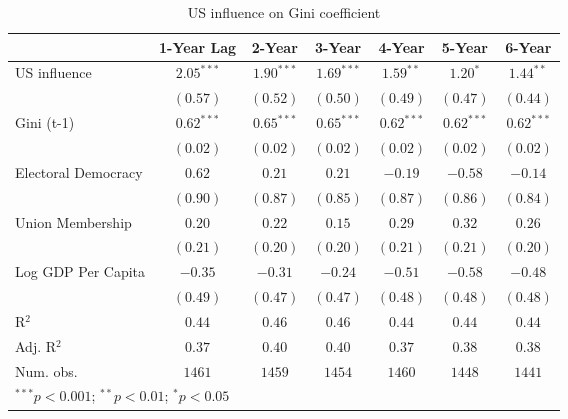 
\begin{table}
\caption{US influence on Gini coefficient}
\begin{center}
\begin{tabular}{l c c c c c c}
\toprule
 & 1-Year Lag & 2-Year & 3-Year & 4-Year & 5-Year & 6-Year \\
\midrule
US influence        & $\mathbf{2.05}^{***}$ & $\mathbf{1.90}^{***}$ & $\mathbf{1.69}^{***}$ & $\mathbf{1.59}^{**}$  & $\mathbf{1.20}^{*}$   & $\mathbf{1.44}^{**}$  \\
                    & $(0.57)$              & $(0.52)$              & $(0.50)$              & $(0.49)$              & $(0.47)$              & $(0.44)$              \\
Gini (t-1)          & $\mathbf{0.62}^{***}$ & $\mathbf{0.65}^{***}$ & $\mathbf{0.65}^{***}$ & $\mathbf{0.62}^{***}$ & $\mathbf{0.62}^{***}$ & $\mathbf{0.62}^{***}$ \\
                    & $(0.02)$              & $(0.02)$              & $(0.02)$              & $(0.02)$              & $(0.02)$              & $(0.02)$              \\
Electoral Democracy & $0.62$                & $0.21$                & $0.21$                & $-0.19$               & $-0.58$               & $-0.14$               \\
                    & $(0.90)$              & $(0.87)$              & $(0.85)$              & $(0.87)$              & $(0.86)$              & $(0.84)$              \\
Union Membership    & $0.20$                & $0.22$                & $0.15$                & $0.29$                & $0.32$                & $0.26$                \\
                    & $(0.21)$              & $(0.20)$              & $(0.20)$              & $(0.21)$              & $(0.21)$              & $(0.20)$              \\
Log GDP Per Capita  & $-0.35$               & $-0.31$               & $-0.24$               & $-0.51$               & $-0.58$               & $-0.48$               \\
                    & $(0.49)$              & $(0.47)$              & $(0.47)$              & $(0.48)$              & $(0.48)$              & $(0.48)$              \\
\midrule
R$^2$               & $0.44$                & $0.46$                & $0.46$                & $0.44$                & $0.44$                & $0.44$                \\
Adj. R$^2$          & $0.37$                & $0.40$                & $0.40$                & $0.37$                & $0.38$                & $0.38$                \\
Num. obs.           & $1461$                & $1459$                & $1454$                & $1460$                & $1448$                & $1441$                \\
\bottomrule
\multicolumn{7}{l}{\scriptsize{$^{***}p<0.001$; $^{**}p<0.01$; $^{*}p<0.05$}}
\end{tabular}
\label{table:coefficients}
\end{center}
\end{table}
